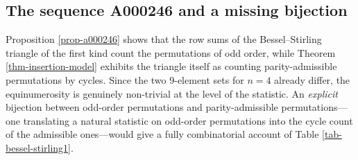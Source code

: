 \documentclass[a4paper]{amsart}
\numberwithin{equation}{section}
\begin{document}
\subsection{The sequence A000246 and a missing bijection}
Proposition \ref{prop-a000246} shows that the row sums of the Bessel--Stirling triangle of the first kind count the permutations of odd order, while Theorem \ref{thm-insertion-model} exhibits the triangle itself as counting parity-admissible permutations by cycles. Since the two $9$-element sets for $n = 4$ already differ, the equinumerosity is genuinely non-trivial at the level of the statistic. An \emph{explicit} bijection between odd-order permutations and parity-admissible permutations---one translating a natural statistic on odd-order permutations into the cycle count of the admissible ones---would give a fully combinatorial account of Table \ref{tab-bessel-stirling1}.
\end{document}
